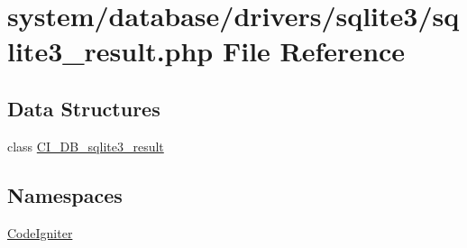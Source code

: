 \hypertarget{sqlite3__result_8php}{}\section{system/database/drivers/sqlite3/sqlite3\+\_\+result.php File Reference}
\label{sqlite3__result_8php}
\subsection*{Data Structures}
\begin{DoxyCompactItemize}
\item 
class \mbox{\hyperlink{class_c_i___d_b__sqlite3__result}{C\+I\+\_\+\+D\+B\+\_\+sqlite3\+\_\+result}}
\end{DoxyCompactItemize}
\subsection*{Namespaces}
\begin{DoxyCompactItemize}
\item 
 \mbox{\hyperlink{namespace_code_igniter}{Code\+Igniter}}
\end{DoxyCompactItemize}
